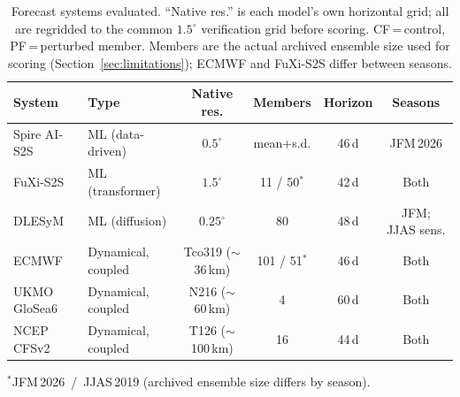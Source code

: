 \begin{table}[t]
  \centering
  \caption{Forecast systems evaluated. ``Native res.'' is each model's own
  horizontal grid; all are regridded to the common $1.5^\circ$ verification
  grid before scoring. CF\,=\,control, PF\,=\,perturbed member. Members are
  the actual archived ensemble size used for scoring
  (Section~\ref{sec:limitations}); ECMWF and FuXi-S2S differ between seasons.}
  \label{tab:models}
  \footnotesize
  \setlength{\tabcolsep}{3pt}
  \begin{tabular}{llcccc}
    \toprule
    System & Type & Native res. & Members & Horizon & Seasons \\
    \midrule
    Spire AI-S2S & ML (data-driven)    & $0.5^\circ$        & mean+s.d.        & 46\,d & JFM\,2026 \\
    FuXi-S2S     & ML (transformer)    & $1.5^\circ$        & 11 / 50$^{\ast}$ & 42\,d & Both \\
    DLESyM       & ML (diffusion)      & $0.25^\circ$       & 80               & 48\,d & JFM; JJAS sens. \\
    ECMWF        & Dynamical, coupled  & Tco319 ($\sim$36\,km) & 101 / 51$^{\ast}$ & 46\,d & Both \\
    UKMO GloSea6 & Dynamical, coupled  & N216 ($\sim$60\,km)   & 4              & 60\,d & Both \\
    NCEP CFSv2   & Dynamical, coupled  & T126 ($\sim$100\,km)  & 16             & 44\,d & Both \\
    \bottomrule
  \end{tabular}
  \vspace{2pt}
  {\footnotesize $^{\ast}$JFM\,2026~/~JJAS\,2019 (archived ensemble size differs by season).}
\end{table}
